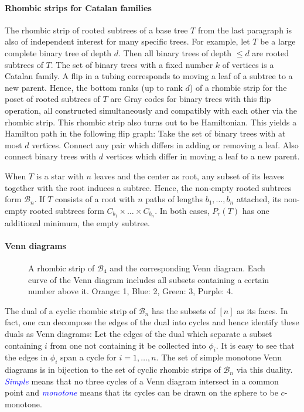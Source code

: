 \documentclass[fontsize=11pt,a4paper,DIV=12]{scrartcl}
\newcommand{\defn}[1]{\textsl{\textcolor{Blue}{#1}}}
\begin{document}
\paragraph{Rhombic strips for Catalan families}
The rhombic strip of rooted subtrees of a base tree $T$ from the last paragraph is also of independent interest for many specific trees. For example, let $T$ be a large complete binary tree of depth $d$. Then all binary trees of depth $\le d$ are rooted subtrees of $T$. The set of binary trees with a fixed number $k$ of vertices is a Catalan family. A flip in a tubing corresponds to moving a leaf of a subtree to a new parent. Hence, the bottom ranks (up to rank $d$) of a rhombic strip for the poset of rooted subtrees of $T$ are Gray codes for binary trees with this flip operation, all constructed simultaneously and compatibly with each other via the rhombic strip. This rhombic strip also turns out to be Hamiltonian. This yields a Hamilton path in the following flip graph: Take the set of binary trees with at most $d$ vertices. Connect any pair which differs in adding or removing a leaf. Also connect binary trees with $d$ vertices which differ in moving a leaf to a new parent.

When $T$ is a star with $n$ leaves and the center as root, any subset of its leaves together with the root induces a subtree. Hence, the non-empty rooted subtrees form $\mathcal B_n$. If $T$ consists of a root with $n$ paths of lengths $b_1,\ldots,b_n$ attached, its non-empty rooted subtrees form $C_{b_1}\times\ldots\times C_{b_n}$. In both cases, $P_r(T)$ has one additional minimum, the empty subtree.

\paragraph{Venn diagrams}
\begin{figure}
	\centering
	
	\caption{A rhombic strip of $\mathcal B_4$ and the corresponding Venn diagram. Each curve of the Venn diagram includes all subsets containing a certain number above it. Orange: 1, Blue: 2, Green: 3, Purple: 4.}
	\label{fig:Boolean4 venn}
\end{figure}
The dual of a cyclic rhombic strip of $\mathcal B_n$ has the subsets of $[n]$ as its faces. In fact, one can decompose the edges of the dual into cycles and hence identify these duals as Venn diagrams: Let the edges of the dual which separate a subset containing $i$ from one not containing it be collected into $\phi_i$. It is easy to see that the edges in $\phi_i$ span a cycle for $i=1,\ldots,n$. The set of simple monotone Venn diagrams is in bijection to the set of cyclic rhombic strips of $\mathcal B_n$ via this duality. \defn{Simple} means that no three cycles of a Venn diagram intersect in a common point and \defn{monotone} means that its cycles can be drawn on the sphere to be $c$-monotone.
\end{document}
